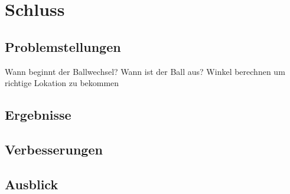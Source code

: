 \chapter{Schluss}
\section{Problemstellungen}
Wann beginnt der Ballwechsel?
Wann ist der Ball aus?
Winkel berechnen um richtige Lokation zu bekommen
\section{Ergebnisse}
\section{Verbesserungen}
\section{Ausblick}